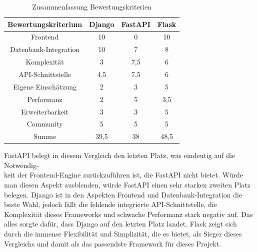 \documentclass[letterpaper,11pt,leqno]{article}
\begin{document}
\begin{table}[h!]
	\begin{center}
		\begin{tabular}{|c||c|c|c|}
			\hline
			Bewertungskriterium & Django & FastAPI & Flask\\
			\hline\hline
			Frontend & 10 & 0 & 10\\
			Datenbank-Integration & 10 & 7 & 8\\
			Komplexität & 3 & 7,5 & 6\\
			API-Schnittstelle & 4,5 & 7,5 & 6\\
			Eigene Einschätzung & 2 & 3 & 5\\
			Performanz & 2 & 5 & 3,5\\
			Erweiterbarkeit & 3 & 3 & 5\\
			Community & 5 & 5 & 5\\
			\hline
			Summe & 39,5 & 38 & 48,5\\
			\hline
		\end{tabular}
		\caption{Zusammenfassung Bewertungskriterien}
	\end{center}
	\label{table:10}
\end{table}
FastAPI belegt in diesem Vergleich den letzten Platz, was eindeutig auf die Notwendig-\\keit der Frontend-Engine zurückzuführen ist,
die FastAPI nicht bietet. Würde man diesen Aspekt ausblenden, würde FastAPI einen sehr starken zweiten Platz belegen. Django ist in
den Aspekten Frontend und Datenbank-Integration die beste Wahl, jedoch fällt die fehlende integrierte API-Schnittstelle, die
Komplexität dieses Frameworks  und schwache Performanz stark negativ auf. Das alles sorgte dafür, dass Django auf den letzten Platz
landet. Flask zeigt sich durch die immense Flexibilität und Simplizität, die es bietet, als Sieger dieses Vergleichs und damit als
das passendste Framework für dieses Projekt.
\end{document}
